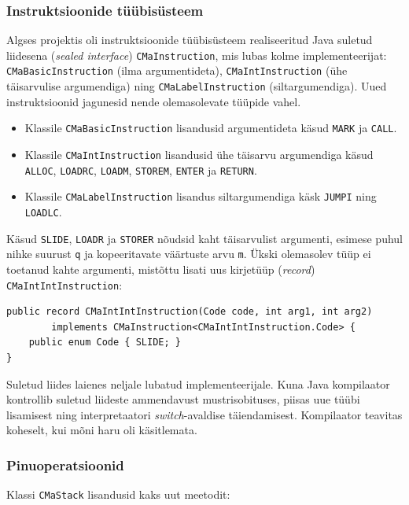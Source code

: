 \subsubsection{Instruktsioonide tüübisüsteem}

Algses projektis oli instruktsioonide tüübisüsteem realiseeritud Java suletud liidesena (\emph{sealed interface}) \texttt{CMaInstruction}, mis lubas kolme implementeerijat: \texttt{CMaBasicInstruction} (ilma argumentideta), \texttt{CMaIntInstruction} (ühe täisarvulise argumendiga) ning \texttt{CMaLabelInstruction} (siltargumendiga). Uued instruktsioonid jagunesid nende olemasolevate tüüpide vahel.

\begin{itemize}
	\item Klassile \texttt{CMaBasicInstruction} lisandusid argumentideta käsud \texttt{MARK} ja \texttt{CALL}.
	\item Klassile \texttt{CMaIntInstruction} lisandusid ühe täisarvu argumendiga käsud \texttt{ALLOC}, \texttt{LOADRC}, \texttt{LOADM}, \texttt{STOREM}, \texttt{ENTER} ja \texttt{RETURN}.
	\item Klassile \texttt{CMaLabelInstruction} lisandus siltargumendiga käsk \texttt{JUMPI} ning \texttt{LOADLC}.
\end{itemize}

Käsud \texttt{SLIDE}, \texttt{LOADR} ja \texttt{STORER} nõudsid kaht täisarvulist argumenti, esimese puhul nihke suurust \texttt{q} ja kopeeritavate väärtuste arvu \texttt{m}. Ükski olemasolev tüüp ei toetanud kahte argumenti, mistõttu lisati uus kirjetüüp (\emph{record}) \texttt{CMaIntIntInstruction}:

\begin{verbatim}
public record CMaIntIntInstruction(Code code, int arg1, int arg2)
        implements CMaInstruction<CMaIntIntInstruction.Code> {
    public enum Code { SLIDE; }
}
\end{verbatim}

Suletud liides laienes neljale lubatud implementeerijale. Kuna Java kompilaator kontrollib suletud liideste ammendavust mustrisobituses, piisas uue tüübi lisamisest ning interpretaatori \emph{switch}-avaldise täiendamisest. Kompilaator teavitas koheselt, kui mõni haru oli käsitlemata.

\subsubsection{Pinuoperatsioonid}

Klassi \texttt{CMaStack} lisandusid kaks uut meetodit:

